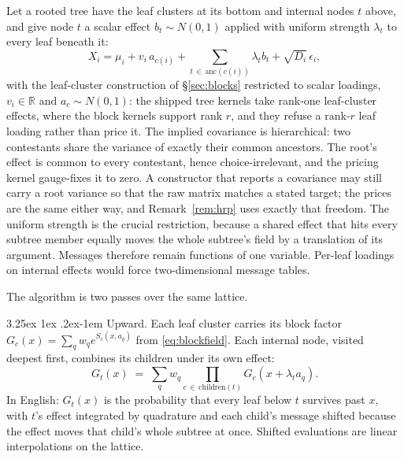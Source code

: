 \documentclass[11pt]{article}
\makeatletter
\renewcommand\paragraph{\@startsection{paragraph}{4}{\z@}%
  {3.25ex \@plus1ex \@minus.2ex}{-1em}%
  {\normalfont\normalsize\itshape}}
\newcommand{\R}{\mathbb{R}}
\makeatother
\begin{document}
Let a rooted tree have the leaf clusters at its bottom and internal nodes $t$
above, and give node $t$ a scalar effect $b_t\sim N(0,1)$ applied with uniform
strength $\lambda_t$ to every leaf beneath it:
\begin{equation}
X_i=\mu_i+v_i\,a_{c(i)}+\sum_{t\,\in\,\mathrm{anc}(c(i))}\lambda_t b_t
    +\sqrt{D_i}\,\epsilon_i ,
\end{equation}
with the leaf-cluster construction of \S\ref{sec:blocks} restricted to
scalar loadings, $v_i\in\R$ and $a_c\sim N(0,1)$: the shipped tree
kernels take rank-one leaf-cluster effects, where the block kernels
support rank $r$, and they refuse a rank-$r$ leaf loading rather than
price it. The
implied covariance is hierarchical: two contestants share the variance of
exactly their common ancestors. The root's effect is common to every contestant, hence
choice-irrelevant, and the pricing kernel gauge-fixes it to zero. A
constructor that reports a covariance may still carry a root variance so
that the raw matrix matches a stated target; the prices are the same
either way, and Remark~\ref{rem:hrp} uses exactly that freedom. The uniform strength is the crucial restriction,
because a shared effect that hits every subtree member equally moves the whole
subtree's field by a translation of its argument. Messages therefore remain
functions of one variable. Per-leaf loadings on internal effects would force
two-dimensional message tables.

The algorithm is two passes over the same lattice.

\paragraph{Upward.} Each leaf cluster carries its block factor
$G_c(x)=\sum_q w_q e^{S_c(x,a_q)}$ from \eqref{eq:blockfield}. Each internal
node, visited deepest first, combines its children under its own effect:
\begin{equation}\label{eq:up}
G_t(x)\;=\;\sum_q w_q \prod_{c\,\in\,\mathrm{children}(t)} G_c\!\left(x+\lambda_t
a_q\right).
\end{equation}
In English: $G_t(x)$ is the probability that every leaf below $t$ survives past
$x$, with $t$'s effect integrated by quadrature and each child's message shifted
because the effect moves that child's whole subtree at once. Shifted evaluations
are linear interpolations on the lattice.
\end{document}
